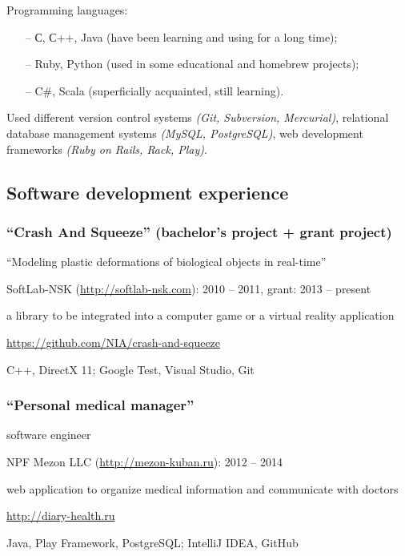 \documentclass[a4paper, 12pt]{article}
\begin{document}
  Programming languages:

  \begin{itemize}[itemsep=1.5mm,topsep=2mm]
    \item[--] С, С++, Java (have been learning and using for a long time);
    \item[--] Ruby, Python (used in some educational and homebrew projects);
    \item[--] C\#, Scala (superficially acquainted, still learning).
  \end{itemize}

  Used different version control systems \emph{(Git, Subversion, Mercurial)}, relational database
  management systems \emph{(MySQL, PostgreSQL)}, web development frameworks \emph{(Ruby on Rails, Rack, Play)}.

  \subsection*{Software development experience}

  \subsubsection*{``Crash And Squeeze'' (bachelor's project + grant project)}
  \begin{description}[labelindent=1em] %
    \item[Topic:] ``Modeling plastic deformations of biological objects in real-time''
    \item[Company:] SoftLab-NSK (\url{http://softlab-nsk.com}): 2010 -- 2011, grant: 2013 -- present
    \item[Description:] a library to be integrated into a computer game or a virtual reality application
    \item[Source code:] \url{https://github.com/NIA/crash-and-squeeze}
    \item[Technologies and tools:] C++, DirectX 11; Google Test, Visual Studio, Git
  \end{description}


  \subsubsection*{``Personal medical manager''}
  \begin{description}[labelindent=1em]
    \item[Position:] software engineer
    \item[Company:] NPF Mezon LLC (\url{http://mezon-kuban.ru}): 2012 -- 2014
    \item[Description:] web application to organize medical information and communicate with doctors
    \item[Website:] \url{http://diary-health.ru}
    \item[Technologies and tools:] Java, Play Framework, PostgreSQL; IntelliJ IDEA, GitHub
  \end{description}
\end{document}

